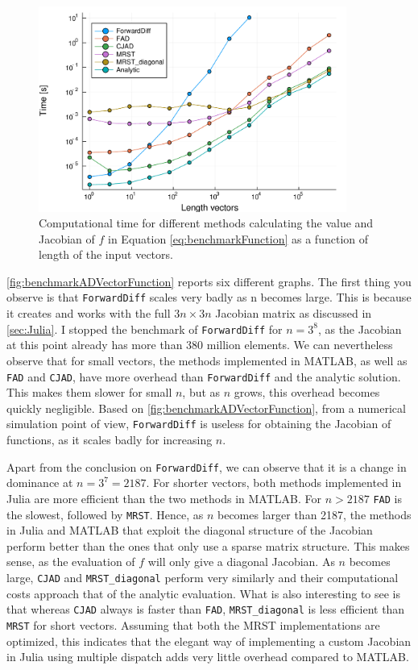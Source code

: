 \begin{figure}[H]
    \centering
    \includegraphics[width = 0.9\textwidth]{figures/benchmark_all_ADs.pdf}
    \caption{Computational time for different methods calculating the value and Jacobian of $f$ in Equation \eqref{eq:benchmarkFunction} as a function of length of the input vectors.}
    \label{fig:benchmarkADVectorFunction}
\end{figure}
\autoref{fig:benchmarkADVectorFunction} reports six different graphs. The first thing you observe is that \texttt{ForwardDiff} scales very badly as n becomes large. This is because it creates and works with the full $3n \times 3n$ Jacobian matrix as discussed in \autoref{sec:Julia}. I stopped the benchmark of \texttt{ForwardDiff} for $n = 3^8$, as the Jacobian at this point already has more than 380 million elements. We can nevertheless observe that for small vectors, the methods implemented in MATLAB, as well as \texttt{FAD} and \texttt{CJAD}, have more overhead than \texttt{ForwardDiff} and the analytic solution. This makes them slower for small $n$, but as $n$ grows, this overhead becomes quickly negligible. Based on \autoref{fig:benchmarkADVectorFunction}, from a numerical simulation point of view, \texttt{ForwardDiff} is useless for obtaining the Jacobian of functions, as it scales badly for increasing $n$.

Apart from the conclusion on \texttt{ForwardDiff}, we can observe that it is a change in dominance at $n = 3^7 = 2187$. For shorter vectors, both methods implemented in Julia are more efficient than the two methods in MATLAB. For $n>2187$ \texttt{FAD} is the slowest, followed by \texttt{MRST}. Hence, as $n$ becomes larger than 2187, the methods in Julia and MATLAB that exploit the diagonal structure of the Jacobian perform better than the ones that only use a sparse matrix structure. This makes sense, as the evaluation of $f$ will only give a diagonal Jacobian. As $n$ becomes large, \texttt{CJAD} and \texttt{MRST\_diagonal} perform very similarly and their computational costs approach that of the analytic evaluation. What is also interesting to see is that whereas \texttt{CJAD} always is faster than \texttt{FAD}, \texttt{MRST\_diagonal} is less efficient than \texttt{MRST} for short vectors. Assuming that both the MRST implementations are optimized, this indicates that the elegant way of implementing a custom Jacobian in Julia using multiple dispatch adds very little overhead compared to MATLAB. 

